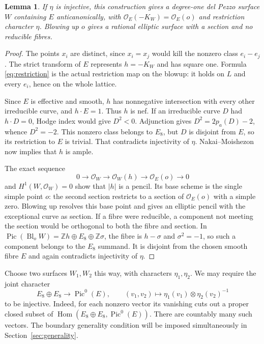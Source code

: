 \documentclass[11pt]{article}
\newtheorem{lemma}[theorem]{Lemma}
\theoremstyle{definition}
\theoremstyle{remark}
\newcommand{\Z}{\mathbb Z}
\newcommand{\Pic}{\operatorname{Pic}}
\newcommand{\Hom}{\operatorname{Hom}}
\newcommand{\OO}{\mathcal O}
\begin{document}
\begin{lemma}\label{lem:delpezzo}
If $\eta$ is injective, this construction gives a degree-one del Pezzo surface $W$ containing $E$ anticanonically, with $\OO_E(-K_W)=\OO_E(o)$ and restriction character $\eta$. Blowing up $o$ gives a rational elliptic surface with a section and no reducible fibres.
\end{lemma}
\begin{proof}
The points $x_i$ are distinct, since $x_i=x_j$ would kill the nonzero class $e_i-e_j$. The strict transform of $E$ represents $h=-K_W$ and has square one. Formula \eqref{eq:restriction} is the actual restriction map on the blowup: it holds on $L$ and every $e_i$, hence on the whole lattice.

Since $E$ is effective and smooth, $h$ has nonnegative intersection with every other irreducible curve, and $h\cdot E=1$. Thus $h$ is nef. If an irreducible curve $D$ had $h\cdot D=0$, Hodge index would give $D^2<0$. Adjunction gives $D^2=2p_a(D)-2$, whence $D^2=-2$. This nonzero class belongs to $E_8$, but $D$ is disjoint from $E$, so its restriction to $E$ is trivial. That contradicts injectivity of $\eta$. Nakai--Moishezon now implies that $h$ is ample.

The exact sequence
\[
0\longrightarrow\OO_W\longrightarrow\OO_W(h)
\longrightarrow\OO_E(o)\longrightarrow0
\]
and $H^1(W,\OO_W)=0$ show that $|h|$ is a pencil. Its base scheme is the single simple point $o$: the second section restricts to a section of $\OO_E(o)$ with a simple zero. Blowing up resolves this base point and gives an elliptic pencil with the exceptional curve as section. If a fibre were reducible, a component not meeting the section would be orthogonal to both the fibre and section. In
$\Pic(\operatorname{Bl}_oW)=\Z h\oplus E_8\oplus\Z\sigma$, the fibre is $h-\sigma$ and $\sigma^2=-1$, so such a component belongs to the $E_8$ summand. It is disjoint from the chosen smooth fibre $E$ and again contradicts injectivity of $\eta$.
\end{proof}

Choose two surfaces $W_1,W_2$ this way, with characters $\eta_1,\eta_2$. We may require the joint character
\begin{equation}\label{eq:joint}
E_8\oplus E_8\longrightarrow\Pic^0(E),\qquad
(v_1,v_2)\longmapsto\eta_1(v_1)\otimes\eta_2(v_2)^{-1}
\end{equation}
to be injective. Indeed, for each nonzero vector its vanishing cuts out a proper closed subset of $\Hom(E_8\oplus E_8,\Pic^0(E))$. There are countably many such vectors. The boundary generality condition will be imposed simultaneously in Section~\ref{sec:generality}.
\end{document}
